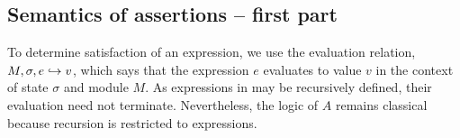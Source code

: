 \subsection{Semantics of assertions %
-- first part}
\label{sect:semantics:assert:standard}

To determine satisfaction of an expression, we    use the evaluation relation, $M, \sigma, e \hookrightarrow v$,
which says that the expression $e$ evaluates
to value $v$ in the context of state $\sigma$ and module $M$.
As expressions in \LangOO may be recursively defined, their evaluation 
need not   %
 terminate. Nevertheless, the logic of $A$ remains classical because recursion is restricted
to expressions. %


